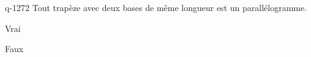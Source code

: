 \begin{truefalse}{q-1272}
Tout trapèze avec deux bases de même longueur est un parallélogramme.
\item* Vrai
\item Faux
\end{truefalse}

